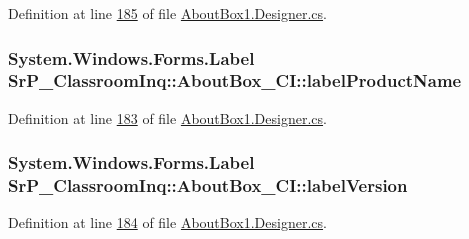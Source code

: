 \-Definition at line \hyperlink{_about_box1_8_designer_8cs_source_l00185}{185} of file \hyperlink{_about_box1_8_designer_8cs_source}{\-About\-Box1.\-Designer.\-cs}.

\hypertarget{class_sr_p___classroom_inq_1_1_about_box___c_i_a63c3b787bac631c7424ff015b247289c}{
\subsubsection[{label\-Product\-Name}]{\setlength{\rightskip}{0pt plus 5cm}\-System.\-Windows.\-Forms.\-Label {\bf \-Sr\-P\-\_\-\-Classroom\-Inq\-::\-About\-Box\-\_\-\-C\-I\-::label\-Product\-Name}}}
\label{class_sr_p___classroom_inq_1_1_about_box___c_i_a63c3b787bac631c7424ff015b247289c}


\-Definition at line \hyperlink{_about_box1_8_designer_8cs_source_l00183}{183} of file \hyperlink{_about_box1_8_designer_8cs_source}{\-About\-Box1.\-Designer.\-cs}.

\hypertarget{class_sr_p___classroom_inq_1_1_about_box___c_i_a2993cc4848bd6149f8162bf55a7fa310}{
\subsubsection[{label\-Version}]{\setlength{\rightskip}{0pt plus 5cm}\-System.\-Windows.\-Forms.\-Label {\bf \-Sr\-P\-\_\-\-Classroom\-Inq\-::\-About\-Box\-\_\-\-C\-I\-::label\-Version}}}
\label{class_sr_p___classroom_inq_1_1_about_box___c_i_a2993cc4848bd6149f8162bf55a7fa310}


\-Definition at line \hyperlink{_about_box1_8_designer_8cs_source_l00184}{184} of file \hyperlink{_about_box1_8_designer_8cs_source}{\-About\-Box1.\-Designer.\-cs}.

